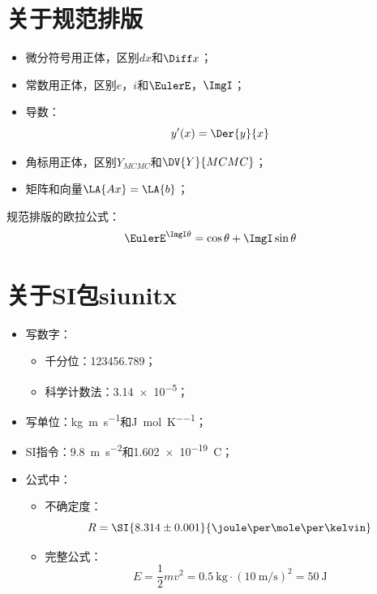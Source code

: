 
\section{关于规范排版}

\begin{itemize}
	\item 微分符号用正体，区别$dx$和$\Diff x$；
	\item 常数用正体，区别$e$，$i$和$\EulerE$，$\ImgI$；
	\item 导数：
	$$
	y'(x) = \Der{y}{x}
	$$
	\item 角标用正体，区别$Y_{MCMC}$和$\DV{Y}{MCMC}$；
	\item 矩阵和向量$\LA{Ax}=\LA{b}$；
\end{itemize}

\begin{ubox}{规范排版的欧拉公式：}
	\begin{equation}
		\EulerE^{\ImgI\theta} = \cos\theta + \ImgI\sin\theta
	\end{equation}
\end{ubox}

\section{关于SI包siunitx}
\begin{itemize}
	\item 写数字：
	\begin{itemize}
		\item 千分位：\num{123456.789}；
		\item 科学计数法：\num{3.14e-5}；
	\end{itemize}
	
	\item 写单位：\si{\kilogram\metre\per\second}和\si{\joule\per\mole\per\kelvin}；
	
	\item SI指令：\SI{9.8}{\metre\per\second\squared}和\SI{1.602e-19}{\coulomb}；
	
	\item 公式中：
	\begin{itemize}
		\item 不确定度：
		\[
		R = \SI{8.314 \pm 0.001}{\joule\per\mole\per\kelvin}
		\]
		\item 完整公式：
		\[
		E = \frac{1}{2} m v^2 = \SI{0.5}{\kilogram} \cdot \left( \SI{10}{\metre\per\second} \right)^2 = \SI{50}{\joule}
		\]
	\end{itemize}
\end{itemize}

